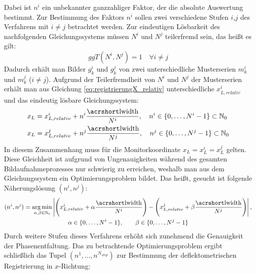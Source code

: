 %
Dabei ist $n^i$ ein unbekannter ganzzahliger Faktor, der die absolute Auswertung bestimmt.
Zur Bestimmung des Faktors $n^i$ sollen zwei verschiedene Stufen $i$,$j$ des Verfahrens mit $i \neq j$ betrachtet werden.
Zur eindeutigen Lösbarkeit des nachfolgenden Gleichungssystems müssen $N^i$ und $N^j$ teilerfremd sein, das heißt es gilt:
%
\begin{equation*}
	ggT(N^i, N^j) = 1
	\quad
	\forall i \neq j
\end{equation*}
%
Dadurch erhält man Bilder $g_k^i$ und $g_k^j$ von zwei unterschiedliche Musterserien $m_k^i$ und $m_k^j$ ($i \neq j$).
Aufgrund der Teilerfremdheit von $N^i$ und $N^j$ der Musterserien erhält man aus Gleichung \ref{eq:registrierungX_relativ} unterschiedliche $x_{L,relativ}^i$ und das eindeutig lösbare Gleichungssystem:
%
\begin{equation}\label{eq:gleichungssystemRegistrierung}
	\begin{split}
		x_L & = x_{L,relativ}^i + n^i \dfrac{\acrshortmath{lwidth}}{N^i},
		\quad n^i \in \lbrace 0,\ldots, N^i - 1 \rbrace \subset \mathbb{N}_0\\
		x_L & = x_{L,relativ}^j + n^j \dfrac{\acrshortmath{lwidth}}{N^j},
		\quad n^j \in \lbrace 0,\ldots, N^j - 1 \rbrace \subset \mathbb{N}_0
	\end{split}
\end{equation}
%
In diesem Zusammenhang muss für die Monitorkoordinate $x_L = x_L^i = x_L^j$ gelten.
Diese Gleichheit ist aufgrund von Ungenauigkeiten während des gesamten Bildaufnahmeprozesses nur schwierig zu erreichen, weshalb man aus dem Gleichungssystem ein Optimierungsproblem bildet.
Das heißt, gesucht ist folgende Näherungslösung $(n^i, n^j)$:
%
\begin{equation}\label{eq:optimierungsProblem_zweiStufen}
	\begin{gathered}	
		(n^i, n^j) = \argmin_{\alpha, \beta \in \mathbb{N}_0}
		\left\lvert
			\Bigg(
				x_{L,relativ}^i + \alpha \dfrac{\acrshortmath{lwidth}}{N^i}
			\Bigg)
			-
			\Bigg(		
				x_{L,relativ}^j + \beta \dfrac{\acrshortmath{lwidth}}{N^j}
			\Bigg)
		\right\rvert,\\
		\alpha \in \lbrace 0,\ldots, N^i - 1\rbrace,
		\qquad
		\beta \in \lbrace 0,\ldots, N^j - 1\rbrace
	\end{gathered}
\end{equation}
%
Durch weitere Stufen dieses Verfahrens erhöht sich zunehmend die Genauigkeit der Phasenentfaltung.
Das zu betrachtende Optimierungsproblem ergibt schließlich das Tupel $(n^1,\ldots, n^{N_{step}})$ zur Bestimmung der deflektometrischen Registrierung in $x$-Richtung:

